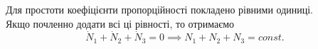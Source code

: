 Для простоти коефіцієнти пропорційності покладено рівними одиниці. \\

Якщо почленно додати всі ці рівності, то отримаємо
\begin{equation}
    \dot N_1 + \dot N_2 + \dot N_3 = 0 \implies N_1 + N_2 + N_3 = const.
\end{equation}


